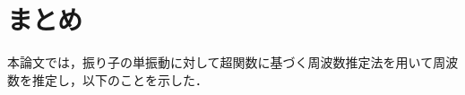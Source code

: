 \documentclass[a4paper,12pt]{jarticle}
\begin{document}
\newpage

\section{まとめ}
本論文では，振り子の単振動に対して超関数に基づく周波数推定法を用いて周波数を推定し，以下のことを示した．
\end{document}
